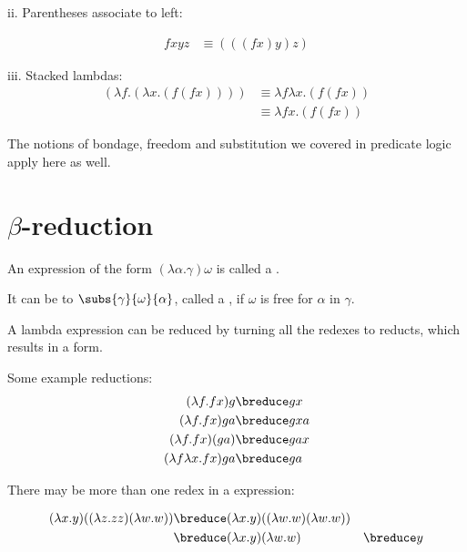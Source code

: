 \documentclass[11pt]{article}
\begin{document}
{{\item[ii.] Parentheses associate to left:    

\begin{align*}
fxyz & \equiv (((fx)y)z)
\end{align*}

\item[iii.] Stacked lambdas:
\begin{align*}
(\lambda f.(\lambda x.(f(fx))))  &\equiv \lambda f \lambda x.(f(fx)) \\
& \equiv \lambda f x.(f(fx))
\end{align*}
}

\item The notions of bondage, freedom and substitution we covered in predicate
logic apply here as well.

\section{$\beta$-reduction}

\item An expression of the form $(\lambda \alpha.\gamma)\omega$ is called a
. 


\item It can be  to $\subs{\gamma}{\omega}{\alpha}$,
called a , if $\omega$ is free for $\alpha$ in $\gamma$.

\item  A lambda expression can be reduced by turning all the redexes to reducts,
which results in a  form.

\item Some example reductions:
\begin{align*}
(\lambda f.fx)g  & \breduce gx \\
(\lambda f.fx)ga  & \breduce gxa \\
(\lambda f.fx)(ga) & \breduce gax \\
(\lambda f\lambda x.fx)g a & \breduce ga \\
\end{align*}

\item There may be more than one redex in a
expression:

\begin{align*}
(\lambda x.y)((\lambda z.zz)(\lambda w.w)) & \breduce (\lambda x.y)((\lambda w.w)(\lambda w.w))\\
											& \breduce (\lambda x.y)(\lambda w.w)
											& \breduce y 
\end{align*}

}
\end{document}
